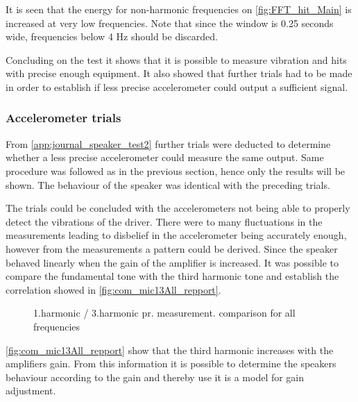 %


It is seen that the energy for non-harmonic frequencies on \autoref{fig:FFT_hit_Main} is increased at very low frequencies. %
Note that since the window is 0.25 seconds wide, frequencies below 4 Hz should be discarded.

Concluding on the test it shows that it is possible to measure vibration and hits with precise enough equipment. It also showed that further trials had to be made in order to establish if less precise accelerometer could output a sufficient signal.

\subsubsection{Accelerometer trials}

From \autoref{app:journal_speaker_test2} further trials were deducted to determine whether a less precise accelerometer could measure the same output. Same procedure was followed as in the previous section, hence only the results will be shown. The behaviour of the speaker was identical with the preceding trials. 

The trials could be concluded with the accelerometers not being able to properly detect the vibrations of the driver. There were to many fluctuations in the measurements leading to disbelief in the accelerometer being accurately enough, however from the measurements a pattern could be derived. Since the speaker behaved linearly when the gain of the amplifier is increased. It was possible to compare the fundamental tone with the third harmonic tone and establish the correlation showed in \autoref{fig:com_mic13All_repport}.

\begin{figure}[H]
    \centering
    
    \caption{1.harmonic / 3.harmonic pr. measurement. comparison for all frequencies}
\label{fig:com_mic13All_repport}
\end{figure}  

\autoref{fig:com_mic13All_repport} show that the third harmonic increases with the amplifiers gain. From this information it is possible to determine the speakers behaviour according to the gain and thereby use it is a model for gain adjustment.


